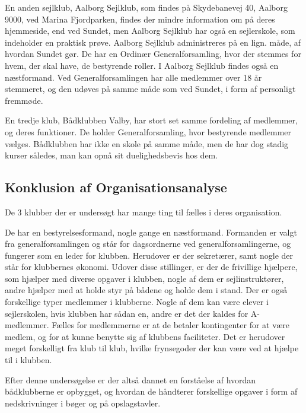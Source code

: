 En anden sejlklub, Aalborg Sejlklub, som findes på Skydebanevej 40, Aalborg 9000, ved Marina Fjordparken, findes der
mindre information om på deres hjemmeside, end ved Sundet, men Aalborg Sejlklub har også en sejlerskole, som indeholder en
praktisk prøve.  Aalborg Sejlklub administreres på en lign. måde, af hvordan Sundet gør. De har en
Ordinær Generalforsamling, hvor der stemmes for hvem, der skal have, de bestyrende roller. I Aalborg Sejlklub findes også
en næstformand. Ved Generalforsamlingen har alle medlemmer over 18 år stemmeret, og den udøves på samme måde som ved
Sundet, i form af personligt fremmøde.\citep{AalborgSejlklub}

En tredje klub, Bådklubben Valby, har stort set samme fordeling af medlemmer, og deres funktioner. De holder
Generalforsamling, hvor bestyrende medlemmer vælges. Bådklubben har ikke en skole på samme måde, men de har dog stadig
kurser således, man kan opnå sit duelighedsbevis hos dem.\citep{BaadklubbenValby}


\subsection{Konklusion af Organisationsanalyse}

De 3 klubber der er undersøgt har mange ting til fælles i deres organisation.

De har en bestyrelsesformand, nogle gange en næstformand. Formanden er valgt fra generalforsamlingen og 
står for dagsordnerne ved generalforsamlingerne, og fungerer som en leder for klubben. Herudover er der sekretærer, samt
nogle der står for klubbernes økonomi. Udover disse stillinger, er der de frivillige hjælpere, som hjælper med diverse
opgaver i klubben, nogle af dem er sejlinstruktører, andre hjælper med at holde styr på bådene og holde dem i stand. Der
er også forskellige typer medlemmer i klubberne. Nogle af dem kan være elever i sejlerskolen, hvis klubben har sådan en,
andre er det der kaldes for A-medlemmer. Fælles for medlemmerne er at de betaler kontingenter for at være medlem, og for
at kunne benytte sig af klubbens faciliteter. Det er herudover meget forskelligt fra klub til klub, hvilke frynsegoder
der kan være ved at hjælpe til i klubben.

Efter denne undersøgelse er der altså dannet en forståelse af hvordan bådklubberne er opbygget, og hvordan de håndterer
forskellige opgaver i form af nedskrivninger i bøger og på opslagstavler.


